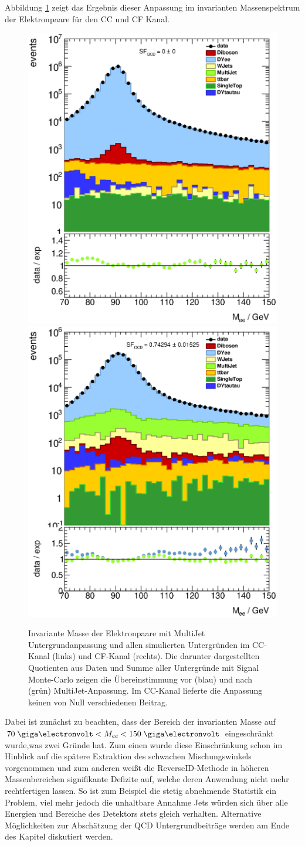 Abbildung \ref{fig:multijet} zeigt das Ergebnis dieser Anpassung im invarianten
Massenspektrum der Elektronpaare für den \ac{CC} und \ac{CF} Kanal.
\begin{figure}[h]
    \centering
    \includegraphics[width=.48\textwidth]{plots/mee_cc}
    \hfill
    \includegraphics[width=.48\textwidth]{plots/mee_cf}
    \caption[Invariante Masse der Elektronpaare nach MultiJet
        Untergrundanpassung]
        {Invariante Masse der Elektronpaare mit MultiJet Untergrundanpassung
        und allen simulierten Untergründen im \ac{CC}-Kanal (links) und
        \ac{CF}-Kanal (rechts). Die darunter dargestellten Quotienten aus Daten
        und Summe aller Untergründe mit Signal Monte-Carlo zeigen die
        Übereinstimmung vor (blau) und nach (grün) MultiJet-Anpassung. Im
        CC-Kanal lieferte die Anpassung keinen von Null verschiedenen Beitrag.}
    \label{fig:multijet}
\end{figure}
Dabei ist zunächst zu beachten, dass der Bereich der invarianten Masse auf
$70\GeV < M_{ee} < 150\GeV$ eingeschränkt wurde,was zwei Gründe hat. Zum einen
wurde diese Einschränkung schon im Hinblick auf die spätere Extraktion des
schwachen Mischungswinkels vorgenommen und zum anderen weißt die
ReverseID-Methode in höheren Massenbereichen signifikante Defizite auf, welche
deren Anwendung nicht mehr rechtfertigen lassen. So ist zum Beispiel die stetig
abnehmende Statistik ein Problem, viel mehr jedoch die unhaltbare Annahme Jets
würden sich über alle Energien und Bereiche des Detektors stets gleich
verhalten. Alternative Möglichkeiten zur Abschätzung der \ac{QCD}
Untergrundbeiträge werden am Ende des Kapitel diskutiert werden.


